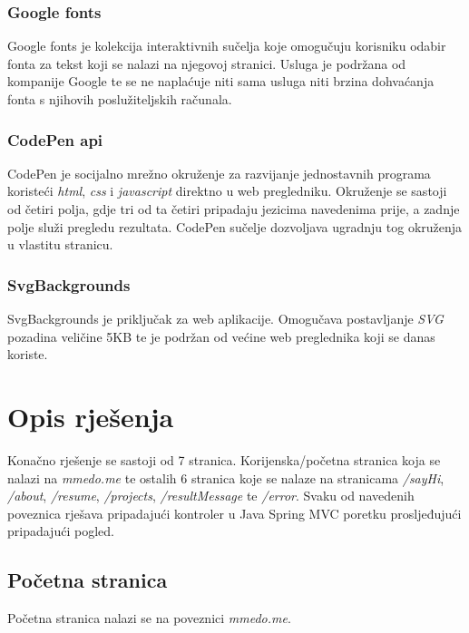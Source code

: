 \documentclass[times, utf8, zavrsni, numeric]{fer}
\begin{document}
\subsection{Google fonts}
\qquad Google fonts je kolekcija interaktivnih sučelja koje omogučuju korisniku odabir fonta za tekst koji se nalazi na njegovoj stranici.
Usluga je podržana od kompanije Google te se ne naplaćuje niti sama usluga niti brzina dohvaćanja fonta s njihovih poslužiteljskih računala.
\subsection{CodePen api}
\qquad CodePen je socijalno mrežno okruženje za razvijanje jednostavnih programa koristeći \textit{html}, \textit{css} i \textit{javascript} direktno u web pregledniku.
Okruženje se sastoji od četiri polja, gdje tri od ta četiri pripadaju jezicima navedenima prije, a zadnje polje služi pregledu rezultata.
CodePen sučelje dozvoljava ugradnju tog okruženja u vlastitu stranicu.
\subsection{SvgBackgrounds}
\qquad SvgBackgrounds je priključak za web aplikacije.
Omogučava postavljanje \textit{SVG}\footnotemark{} pozadina veličine 5KB te je podržan od većine web preglednika koji se danas koriste.

\chapter{Opis rješenja}
\qquad Konačno rješenje se sastoji od 7 stranica.
Korijenska/početna stranica koja se nalazi na \textit{mmedo.me} te ostalih 6 stranica koje se nalaze na stranicama \textit{/sayHi}, \textit{/about}, \textit{/resume}, \textit{/projects}, \textit{/resultMessage} te \textit{/error}.
Svaku od navedenih poveznica rješava pripadajući kontroler u Java Spring MVC poretku prosljeđujući pripadajući pogled.

\pagebreak
\section{Početna stranica}
\qquad Početna stranica nalazi se na poveznici \textit{mmedo.me}.
\end{document}
